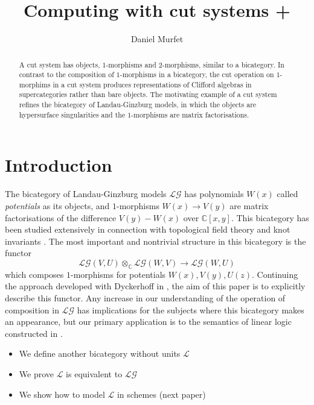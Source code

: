 \documentclass[english,letter paper,12pt,leqno]{article}
\theoremstyle{example}
\numberwithin{equation}{section}
\def\res{\operatorname{Res}}
\def\LG{\mathcal{LG}}
\def\be{\begin{equation}}
\def\ee{\end{equation}}
\def\nC{\mathds{C}}
\begin{document}
\def\Res{\res\!}
\newcommand{\ud}{\mathrm{d}}
\newcommand{\Ress}[1]{\res_{#1}\!}
\newcommand{\cat}[1]{\mathcal{#1}}
\newcommand{\lto}{\longrightarrow}
\newcommand{\xlto}[1]{\stackrel{#1}\lto}
\newcommand{\mf}[1]{\mathfrak{#1}}
\newcommand{\md}[1]{\mathscr{#1}}
\def\l{\,|\,}
\def\sgn{\textup{sgn}}

\title{Computing with cut systems +}
\author{Daniel Murfet}

\maketitle

\begin{abstract}
A cut system has objects, $1$-morphisms and $2$-morphisms, similar to a bicategory. In contrast to the composition of $1$-morphisms in a bicategory, the cut operation on $1$-morphims in a cut system produces representations of Clifford algebras in supercategories rather than bare objects. The motivating example of a cut system refines the bicategory of Landau-Ginzburg models, in which the objects are hypersurface singularities and the $1$-morphisms are matrix factorisations.
\end{abstract}

\tableofcontents

\section{Introduction}

The bicategory of Landau-Ginzburg models $\LG$ has polynomials $W(x)$ called \textsl{potentials} as its objects, and $1$-morphisms $W(x) \lto V(y)$ are matrix factorisations of the difference $V(y) - W(x)$ over $\nC[x,y]$. This bicategory has been studied extensively in connection with topological field theory \cite{??} and knot invariants \cite{??}. The most important and nontrivial structure in this bicategory is the functor
\be\label{eq:intro_functor_comp}
\LG(V,U) \otimes_{\nC} \LG(W, V) \lto \LG(W,U)
\ee
which composes $1$-morphisms for potentials $W(x),V(y),U(z)$. Continuing the approach developed with Dyckerhoff in \cite{??}, the aim of this paper is to explicitly describe this functor. Any increase in our understanding of the operation of composition in $\LG$ has implications for the subjects where this bicategory makes an appearance, but our primary application is to the semantics of linear logic constructed in \cite{??}.

\begin{itemize}
\item We define another bicategory without units $\cat{L}$
\item We prove $\cat{L}$ is equivalent to $\LG$
\item We show how to model $\cat{L}$ in schemes (next paper)
\end{itemize}
\end{document}
